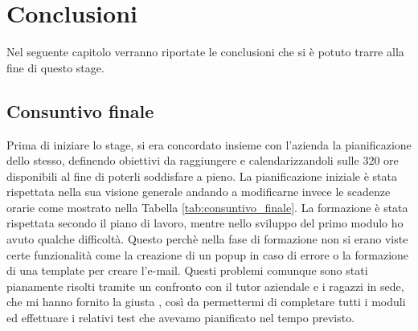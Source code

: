 
\hypertarget{(chap:capitolo8)}{}
\chapter{Conclusioni}
Nel seguente capitolo verranno riportate le conclusioni che si è potuto trarre alla fine di questo stage.
\section{Consuntivo finale}
Prima di iniziare lo stage, si era concordato insieme con l'azienda la pianificazione dello stesso, definendo obiettivi da raggiungere e calendarizzandoli sulle 320 ore disponibili al fine di poterli soddisfare a pieno. La pianificazione iniziale è stata rispettata nella sua visione generale andando a modificarne invece le scadenze orarie come mostrato nella Tabella \ref{tab:consuntivo_finale}. La formazione è stata rispettata secondo il piano di lavoro, mentre nello sviluppo del primo modulo  ho avuto qualche difficoltà. Questo perchè nella fase di formazione non si erano viste certe funzionalità come la creazione di un popup in caso di errore o la formazione di una template per creare l'e-mail. Questi problemi comunque sono stati pianamente risolti tramite un confronto con il tutor aziendale e i ragazzi in sede, che mi hanno fornito la giusta , così da permettermi di completare tutti i moduli ed effettuare i relativi test che avevamo pianificato nel tempo previsto.

